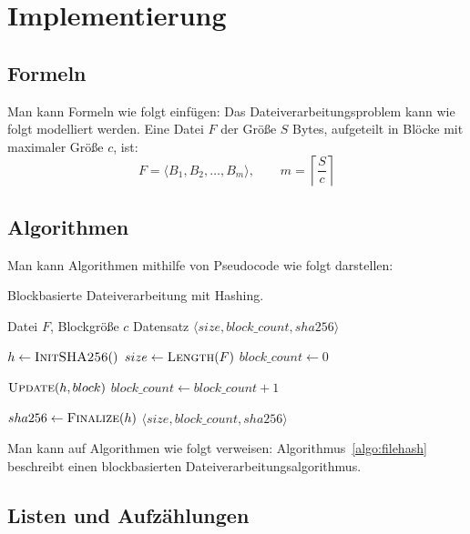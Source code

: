 \chapter{Implementierung}
\label{chap:implementation}

\section{Formeln}

Man kann Formeln wie folgt einfügen: Das Dateiverarbeitungsproblem kann wie folgt modelliert werden. Eine Datei $F$ der Größe $S$ Bytes, aufgeteilt in Blöcke mit maximaler Größe $c$, ist:
\[ F = \langle B_1, B_2, \ldots, B_m \rangle, \qquad m = \left\lceil \frac{S}{c} \right\rceil \]

\section{Algorithmen}

Man kann Algorithmen mithilfe von Pseudocode wie folgt darstellen:

\begin{algorithm}[htbp]
    \caption{Blockbasierte Dateiverarbeitung mit Hashing.}
    \label{algo:filehash}
    \begin{algorithmic}[1]
        \Require Datei $F$, Blockgröße $c$
        \Ensure Datensatz $\langle size, block\_count, sha256 \rangle$

        \State $h \gets \textsc{InitSHA256}()$ 
        \State $size \gets \textsc{Length}(F)$
        \State $block\_count \gets 0$
        \Statex

        \State $\textsc{Update}(h, block)$
        \State $block\_count \gets block\_count + 1$
        \EndFor
        \Statex

        \State $sha256 \gets \textsc{Finalize}(h)$
        \State \Return $\langle size, block\_count, sha256 \rangle$
    \end{algorithmic}
\end{algorithm}

Man kann auf Algorithmen wie folgt verweisen: Algorithmus~\ref{algo:filehash} beschreibt einen blockbasierten Dateiverarbeitungsalgorithmus.

\section{Listen und Aufzählungen}

